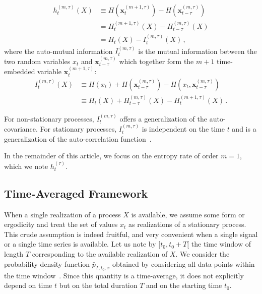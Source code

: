 \documentclass[aps,pra,groupedaddress,notitlepage]{revtex4-1}
\begin{document}
\begin{subequations}
\begin{align}
h_{t}^{(m,\tau)}(X) &\equiv H(\textbf{x}_t^{(m+1,\tau)}) - H(\textbf{x}_{t-\tau}^{(m,\tau)}) \nonumber \\
&= H_t^{(m+1,\tau)}(X) - H_{t-\tau}^{(m,\tau)}(X) \label{eq:h:abstract:diff} \\
&=  H_t(X) - I_{t}^{(m,\tau)}(X) \,, \label{eq:h:abstract:MI}
\end{align}
\end{subequations}
%
where the auto-mutual information $I_{t}^{(m,\tau)}$ is the mutual information between the two random variables $x_t$ and $\textbf{x}_{t-\tau}^{(m, \tau)}$ which together form the $m+1$ time-embedded variable $\textbf{x}_t^{(m+1, \tau)}$:
\begin{align}
I_{t}^{(m,\tau)}(X) &\equiv H(x_{t}) + H(\textbf{x}^{(m,\tau)}_{t-\tau}) - H(x_t, \textbf{x}_{t-\tau}^{(m,\tau)}) \nonumber \\
&\equiv H_{t}(X) + H^{(m,\tau)}_{t-\tau}(X) - H^{(m+1,\tau)}_t(X) \,. \label{eq:MI} 
\end{align}

For non-stationary processes, $I^{(m,\tau)}_t$ offers a generalization of the auto-covariance. For stationary processes, $I^{(m,\tau)}_t$ is independent on the time $t$ and is a generalization of the auto-correlation function~\cite{GraneroBelinchon2019a}.



In the remainder of this article, we focus on the entropy rate of order $m=1$, which we note $h_t^{(\tau)}$.


\subsection{Time-Averaged Framework}\label{sec:taframework}

When a single realization of a process $X$ is available, we assume some form or ergodicity and treat the set of values $x_t$ as realizations of a stationary process. 
This crude assumption is indeed fruitful, and very convenient when a single signal or a single time series is available.
Let us note by $[t_0, t_0+T[$ the time window of length $T$ corresponding to the available realization of $X$. We consider the probability density function $\bar p_{T,t_0,x}$ obtained by considering all data points within the time window~\cite{GraneroBelinchon2019}. Since this quantity is a time-average, it does not explicitly depend on time $t$ but on the total duration $T$ and on the starting time $t_0$. 
\end{document}
